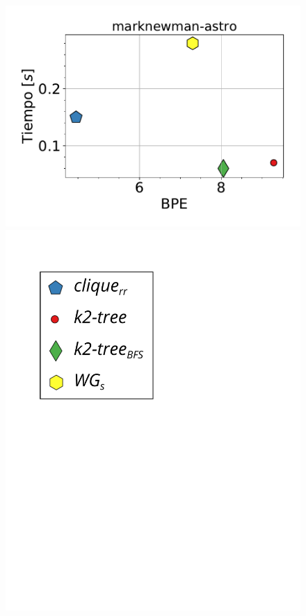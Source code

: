 \begin{figure}
    	\centering
    	\begin{minipage}{1\textwidth}
    		\centering
    		\begin{minipage}{0.45\textwidth}
    			\centering
    			\begin{minipage}{0.75\textwidth}
    				\centering
    				\includegraphics[width=1\linewidth]{img/bpeTimes/secuencial/marknewman-astro.pdf}
    			\end{minipage}
    			\begin{minipage}{0.2\textwidth}
    				\centering
    				\includegraphics[scale=.2, clip, trim=60 194 0 0]{img/bpeTimes/labelSec.pdf}
    			\end{minipage}
    			

\end{minipage}
\end{minipage}
\end{figure}
